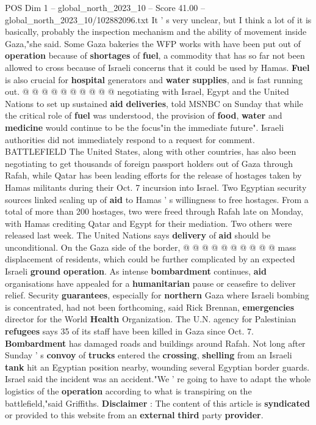 \begin{textsample}{POS Dim 1 – global\_north\_2023\_10 – Score 41.00 – global\_north\_2023\_10/102882096.txt}
It ' s very unclear, but I think a lot of it is basically, probably the inspection mechanism and the ability of movement inside Gaza,"she said.
Some Gaza bakeries the WFP works with have been put out of \textbf{operation} because of \textbf{shortages} of \textbf{fuel}, a commodity that has so far not been allowed to cross because of Israeli concerns that it could be used by Hamas. \textbf{Fuel} is also crucial for \textbf{hospital} generators and \textbf{water} \textbf{supplies}, and is fast running out. @ @ @ @ @ @ @ @ @ @ negotiating with Israel, Egypt and the United Nations to set up sustained \textbf{aid} \textbf{deliveries}, told MSNBC on Sunday that while the critical role of \textbf{fuel} was understood, the provision of \textbf{food}, \textbf{water} and \textbf{medicine} would continue to be the focus"in the immediate future".
Israeli authorities did not immediately respond to a request for comment.
BATTLEFIELD The United States, along with other countries, has also been negotiating to get thousands of foreign passport holders out of Gaza through Rafah, while Qatar has been leading efforts for the release of hostages taken by Hamas militants during their Oct. 7 incursion into Israel.
Two Egyptian security sources linked scaling up of \textbf{aid} to Hamas ' s willingness to free hostages.
From a total of more than 200 hostages, two were freed through Rafah late on Monday, with Hamas crediting Qatar and Egypt for their mediation.
Two others were released last week.
The United Nations says \textbf{delivery} of \textbf{aid} should be unconditional.
On the Gaza side of the border, @ @ @ @ @ @ @ @ @ @ mass displacement of residents, which could be further complicated by an expected Israeli \textbf{ground} \textbf{operation}.
As intense \textbf{bombardment} continues, \textbf{aid} organisations have appealed for a \textbf{humanitarian} pause or ceasefire to deliver relief.
Security \textbf{guarantees}, especially for \textbf{northern} Gaza where Israeli bombing is concentrated, had not been forthcoming, said Rick Brennan, \textbf{emergencies} director for the World \textbf{Health} Organization.
The U.N. agency for Palestinian \textbf{refugees} says 35 of its staff have been killed in Gaza since Oct. 7. \textbf{Bombardment} has damaged roads and buildings around Rafah.
Not long after Sunday ' s \textbf{convoy} of \textbf{trucks} entered the \textbf{crossing}, \textbf{shelling} from an Israeli \textbf{tank} hit an Egyptian position nearby, wounding several Egyptian border guards.
Israel said the incident was an accident."We ' re going to have to adapt the whole logistics of the \textbf{operation} according to what is transpiring on the battlefield,"said Griffiths. \textbf{Disclaimer} : The content of this article is \textbf{syndicated} or provided to this website from an \textbf{external} \textbf{third} party \textbf{provider}.

\end{textsample}
